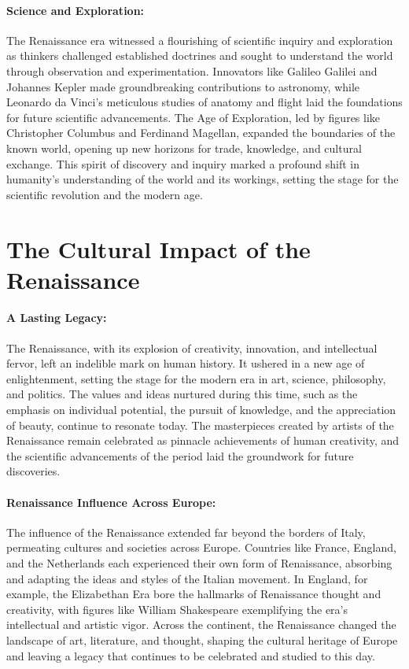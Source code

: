 \documentclass{book}
\begin{document}
\paragraph{Science and Exploration:}
The Renaissance era witnessed a flourishing of scientific inquiry and exploration as thinkers challenged established doctrines and sought to understand the world through observation and experimentation. Innovators like Galileo Galilei and Johannes Kepler made groundbreaking contributions to astronomy, while Leonardo da Vinci's meticulous studies of anatomy and flight laid the foundations for future scientific advancements. The Age of Exploration, led by figures like Christopher Columbus and Ferdinand Magellan, expanded the boundaries of the known world, opening up new horizons for trade, knowledge, and cultural exchange. This spirit of discovery and inquiry marked a profound shift in humanity’s understanding of the world and its workings, setting the stage for the scientific revolution and the modern age.

\section*{The Cultural Impact of the Renaissance}

\paragraph{A Lasting Legacy:}
The Renaissance, with its explosion of creativity, innovation, and intellectual fervor, left an indelible mark on human history. It ushered in a new age of enlightenment, setting the stage for the modern era in art, science, philosophy, and politics. The values and ideas nurtured during this time, such as the emphasis on individual potential, the pursuit of knowledge, and the appreciation of beauty, continue to resonate today. The masterpieces created by artists of the Renaissance remain celebrated as pinnacle achievements of human creativity, and the scientific advancements of the period laid the groundwork for future discoveries.

\paragraph{Renaissance Influence Across Europe:}
The influence of the Renaissance extended far beyond the borders of Italy, permeating cultures and societies across Europe. Countries like France, England, and the Netherlands each experienced their own form of Renaissance, absorbing and adapting the ideas and styles of the Italian movement. In England, for example, the Elizabethan Era bore the hallmarks of Renaissance thought and creativity, with figures like William Shakespeare exemplifying the era’s intellectual and artistic vigor. Across the continent, the Renaissance changed the landscape of art, literature, and thought, shaping the cultural heritage of Europe and leaving a legacy that continues to be celebrated and studied to this day.
\end{document}
